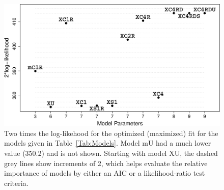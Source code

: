 \documentclass[11pt, titlepage]{article}\usepackage[]{graphicx}\usepackage[]{color}
\begin{document}
\begin{figure}[H]
  \begin{center}
  \includegraphics[width=\linewidth]{figure/Fig-ModelsM2LL-crop.pdf}
  \end{center}
  \caption{Two times the log-likehood for the optimized (maximized) fit for the models given in Table~\ref{Tab:Models}. Model mU had a much lower value (350.2) and is not shown. Starting with model XU, the dashed grey lines show increments of 2, which helps evaluate the relative importance of models by either an AIC or a likelihood-ratio test criteria. \label{Fig-ModelsM2LL}}     
\end{figure}

\end{document}
